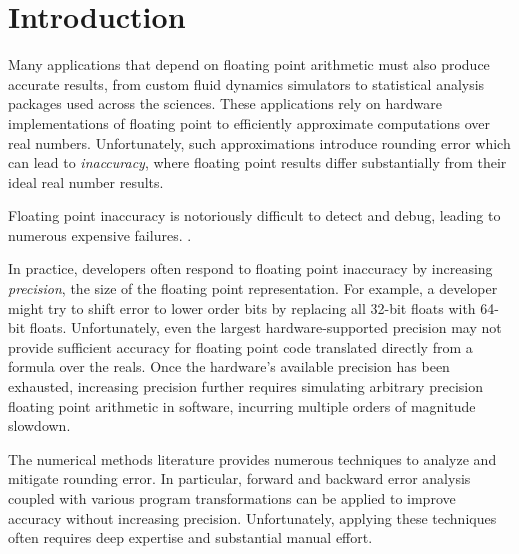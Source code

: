 \documentclass[paper.tex]{subfiles}
\begin{document}
\section{Introduction}
\label{sec:introduction}

Many applications that depend on floating point arithmetic must also
produce accurate results, from custom fluid dynamics simulators to
statistical analysis packages used across the sciences.  These
applications rely on hardware implementations of floating point to
efficiently approximate computations over real numbers.
Unfortunately, such approximations introduce rounding error which can
lead to \textit{inaccuracy}, where floating point results differ
substantially from their ideal real number results.

Floating point inaccuracy is notoriously difficult to detect and
debug, leading to numerous expensive failures.   .

In practice, developers often respond to floating point inaccuracy by
increasing \textit{precision}, the size of the floating point
representation.  For example, a developer might try to shift error to
lower order bits by replacing all 32-bit floats with 64-bit floats.
Unfortunately, even the largest hardware-supported precision may not
provide sufficient accuracy for floating point code translated
directly from a formula over the reals.  Once the hardware's available
precision has been exhausted, increasing precision further requires
simulating arbitrary precision floating point arithmetic in software,
incurring multiple orders of magnitude slowdown.

The numerical methods literature provides numerous techniques to
analyze and mitigate rounding error.  In particular, forward and
backward error analysis  coupled with various program
transformations  can be applied to improve accuracy without
increasing precision.  Unfortunately, applying these techniques often
requires deep expertise and substantial manual effort.
\end{document}
